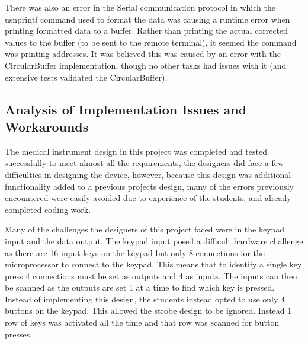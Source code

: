 \documentclass[12pt]{article} %
\begin{document}
    There was also an error in the Serial communication protocol in which the
    usnprintf command used to format the data was causing a runtime error when
    printing formatted data to a buffer.  Rather than printing the actual
    corrected values to the buffer (to be sent to the remote terminal), it
    seemed the command was printing addresses.  It was believed this was
    caused by an error with the CircularBuffer implementation, though no
    other tasks had issues with it (and extensive tests validated the 
    CircularBuffer).  

    \subsection{Analysis of Implementation Issues and Workarounds}



    The medical instrument design in this project was completed and tested
    successfully to meet almost all the requirements, the designers did face a
    few difficulties in designing the device, however, because this design was
    additional functionality added to a previous projects design, many of the
    errors previously encountered were easily avoided due to experience of the
    students, and already completed coding work.
    
    
    Many of the challenges the designers of this project faced were in the
    keypad input and the data output. The keypad input posed a difficult
    hardware challenge as there are 16 input keys on the keypad but only 8
    connections for the microprocessor to connect to the keypad. This means
    that to identify a single key press 4 connections must be set as outputs
    and 4 as inputs. The inputs can then be scanned as the outputs are set 1 at
    a time to find which key is pressed. Instead of implementing this design,
    the students instead opted to use only 4 buttons on the keypad. This
    allowed the strobe design to be ignored. Instead 1 row of keys was
    activated all the time and that row was scanned for button presses.
    
\end{document}
